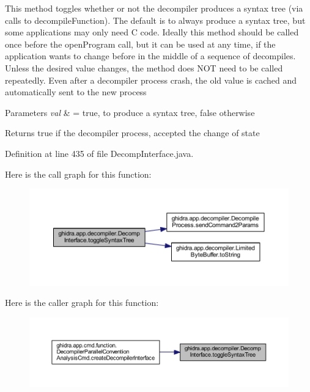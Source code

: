 This method toggles whether or not the decompiler produces a syntax tree (via calls to decompile\+Function). The default is to always produce a syntax tree, but some applications may only need C code. Ideally this method should be called once before the open\+Program call, but it can be used at any time, if the application wants to change before in the middle of a sequence of decompiles. Unless the desired value changes, the method does N\+OT need to be called repeatedly. Even after a decompiler process crash, the old value is cached and automatically sent to the new process 
\begin{DoxyParams}{Parameters}
{\em val} & = true, to produce a syntax tree, false otherwise \\
\hline
\end{DoxyParams}
\begin{DoxyReturn}{Returns}
true if the decompiler process, accepted the change of state 
\end{DoxyReturn}


Definition at line 435 of file Decomp\+Interface.\+java.

Here is the call graph for this function\+:
\nopagebreak
\begin{figure}[H]
\begin{center}
\leavevmode
\includegraphics[width=350pt]{classghidra_1_1app_1_1decompiler_1_1_decomp_interface_ae7b7293b0cbec7e9c71cbbe6f3c8104e_cgraph}
\end{center}
\end{figure}
Here is the caller graph for this function\+:
\nopagebreak
\begin{figure}[H]
\begin{center}
\leavevmode
\includegraphics[width=350pt]{classghidra_1_1app_1_1decompiler_1_1_decomp_interface_ae7b7293b0cbec7e9c71cbbe6f3c8104e_icgraph}
\end{center}
\end{figure}
\mbox{\label{classghidra_1_1app_1_1decompiler_1_1_decomp_interface_a4c703f5ca2f5e769e5de90d28f2924c8}} 
